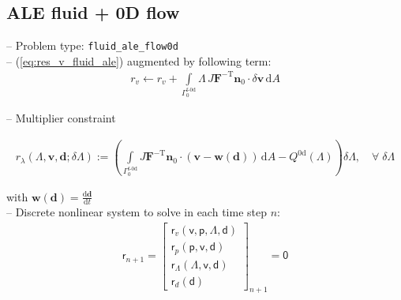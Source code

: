 \documentclass[a4paper,12pt]{report}
\newcommand{\fF}{\text{f}}
\newcommand{\bs}[1]{\boldsymbol{#1}}
\newcommand{\Gm}{\mathit{\Gamma}}
\newcommand{\ROP}{\bs{\mathsf{r}}}
\newcommand{\LMZ}{\bs{\mathsf{\Lambda}}}
\begin{document}
\subsection{ALE fluid + 0D flow}\label{subsec:fluid_ale_flow0d}
-- Problem type: \verb.fluid_ale_flow0d.\\

-- (\ref{eq:res_v_fluid_ale}) augmented by following term:
\begin{align}
r_v \leftarrow r_v + \int\limits_{\Gm_0^{\fF\text{-}\mathrm{0d}}}\!\mathit{\Lambda}\,J\bs{F}^{-\mathrm{T}}\bs{n}_{0}\cdot\delta\bs{v}\,\mathrm{d}A
\end{align}

-- Multiplier constraint

\begin{align}
r_{\lambda}(\mathit{\Lambda},\bs{v},\bs{d};\delta\mathit{\Lambda}):= \left(\int\limits_{\Gm_0^{\mathrm{\fF\text{-}0d}}}\! J\bs{F}^{-\mathrm{T}}\bs{n}_{0}\cdot(\bs{v}-\bs{w}(\bs{d}))\,\mathrm{d}A - Q^{\mathrm{0d}}(\mathit{\Lambda})\right) \delta\mathit{\Lambda}, \quad \forall \; \delta\mathit{\Lambda}
\end{align}

with $\bs{w}(\bs{d})=\frac{\mathrm{d}\bs{d}}{\mathrm{d}t}$\\

-- Discrete nonlinear system to solve in each time step $n$:
\begin{align}
\ROP_{n+1} = \begin{bmatrix} \ROP_{v}(\bs{\mathsf{v}},\bs{\mathsf{p}},\LMZ,\bs{\mathsf{d}}) \\ \ROP_{p}(\bs{\mathsf{p}},\bs{\mathsf{v}},\bs{\mathsf{d}}) \\ \ROP_{\mathit{\Lambda}}(\LMZ,\bs{\mathsf{v}},\bs{\mathsf{d}}) \\ \ROP_{d}(\bs{\mathsf{d}}) \end{bmatrix}_{n+1} = \bs{\mathsf{0}}\label{eq:nonlin_sys_fluid_ale_0d}
\end{align}
\end{document}
